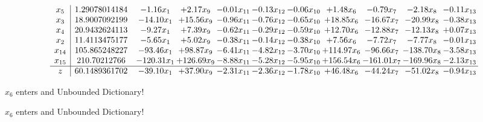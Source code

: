 \documentclass[9pt]{article}
\begin{document}
 \[\begin{array}{c| c c@{\hskip 2pt} c@{\hskip 2pt} c@{\hskip 2pt} c@{\hskip 2pt} c@{\hskip 2pt} c@{\hskip 2pt} c@{\hskip 2pt} c@{\hskip 2pt} c@{\hskip 2pt} }
 x_{5}   &  1.29078014184 & -1.16 x_{1} & +  2.17 x_{9} & -0.01 x_{11} & -0.13 x_{12} & -0.06 x_{10} & +  1.48 x_{6} & -0.79 x_{7} & -2.18 x_{8} & -0.11 x_{13}\\
 x_{3}   &  18.9007092199 & -14.10 x_{1} & + 15.56 x_{9} & -0.96 x_{11} & -0.76 x_{12} & -0.65 x_{10} & + 18.85 x_{6} & -16.67 x_{7} & -20.99 x_{8} & -0.38 x_{13}\\
 x_{4}   &  20.9432624113 & -9.27 x_{1} & +  7.39 x_{9} & -0.62 x_{11} & -0.29 x_{12} & -0.59 x_{10} & + 12.70 x_{6} & -12.88 x_{7} & -12.13 x_{8} & +  0.07 x_{13}\\
 x_{2}   &  11.4113475177 & -5.65 x_{1} & +  5.02 x_{9} & -0.38 x_{11} & -0.14 x_{12} & -0.38 x_{10} & +  7.56 x_{6} & -7.72 x_{7} & -7.77 x_{8} & -0.01 x_{13}\\
 x_{14}   &  105.865248227 & -93.46 x_{1} & + 98.87 x_{9} & -6.41 x_{11} & -4.82 x_{12} & -3.70 x_{10} & + 114.97 x_{6} & -96.66 x_{7} & -138.70 x_{8} & -3.58 x_{13}\\
 x_{15}   &  210.70212766 & -120.31 x_{1} & + 126.69 x_{9} & -8.88 x_{11} & -5.28 x_{12} & -5.95 x_{10} & + 156.54 x_{6} & -161.01 x_{7} & -169.96 x_{8} & -2.13 x_{13}\\
\hline
z    &  60.1489361702 & -39.10 x_{1} & + 37.90 x_{9} & -2.31 x_{11} & -2.36 x_{12} & -1.78 x_{10} & + 46.48 x_{6} & -44.24 x_{7} & -51.02 x_{8} & -0.94 x_{13}\\
\end{array}\]


 $ x_{6} $ enters and Unbounded Dictionary!


 $ x_{6} $ enters and Unbounded Dictionary!
\end{document}
